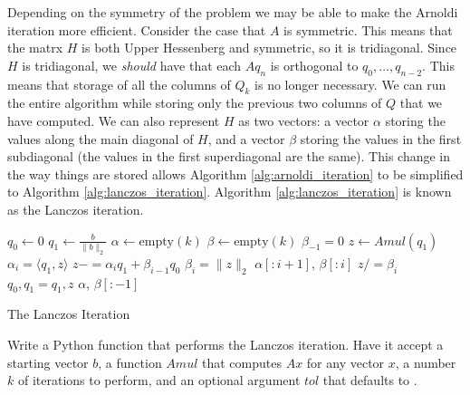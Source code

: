 Depending on the symmetry of the problem we may be able to make the Arnoldi iteration more efficient.
Consider the case that $A$ is symmetric.
This means that the matrx $H$ is both Upper Hessenberg and symmetric, so it is tridiagonal.
Since $H$ is tridiagonal, we \textit{should} have that each $A q_n$ is orthogonal to $q_0, \dots, q_{n-2}$.
This means that storage of all the columns of $Q_k$ is no longer necessary.
We can run the entire algorithm while storing only the previous two columns of $Q$ that we have computed.
We can also represent $H$ as two vectors: a vector $\alpha$ storing the values along the main diagonal of $H$, and a vector $\beta$ storing the values in the first subdiagonal (the values in the first superdiagonal are the same).
This change in the way things are stored allows Algorithm \ref{alg:arnoldi_iteration} to be simplified to Algorithm \ref{alg:lanczos_iteration}.
Algorithm \ref{alg:lanczos_iteration} is known as the Lanczos iteration.

\begin{algorithm}
\begin{algorithmic}[1]
	\State $q_0 \gets 0$								
	\State $q_1 \gets \frac{b}{\|b\|_2}$
	\State $\alpha \gets \text{empty}\left(k\right)$
	\State $\beta \gets \text{empty}\left(k\right)$
	\State $\beta_{-1} = 0$
										
		\State $z \gets Amul\left(q_1\right)$					
		\State $\alpha_i = \langle q_1, z \rangle$				
		\State $z -= \alpha_i q_1 + \beta_{i-1} q_0$				
		\State $\beta_{i} = \|z\|_2$						
										
			\State {} $\alpha [: i+1]$, $\beta [: i]$
		\EndIf
		\State $z /= \beta_i$
		\State $q_0, q_1 = q_1, z$						
	\EndFor
	\State {} $\alpha$, $\beta [: -1]$
\EndProcedure
\end{algorithmic}
\caption{The Lanczos Iteration}
\label{alg:lanczos_iteration}
\end{algorithm}

\begin{problem}
\label{prob:lanczos}
Write a Python function that performs the Lanczos iteration.
Have it accept a starting vector $b$, a function $Amul$ that computes $A x$ for any vector $x$, a number $k$ of iterations to perform, and an optional argument $tol$ that defaults to .
\end{problem}

